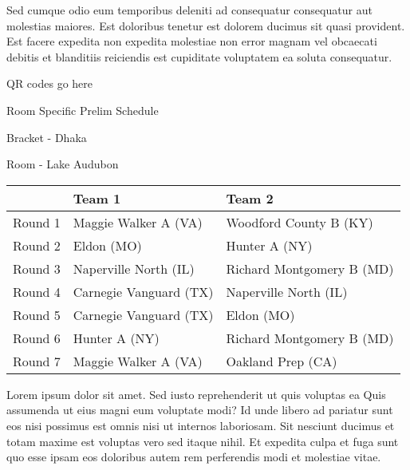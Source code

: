 \documentclass{article}%
\begin{document}
\newline%
Sed cumque odio eum temporibus deleniti ad consequatur consequatur aut molestias maiores. Est doloribus tenetur est dolorem ducimus sit quasi provident. Est facere expedita non expedita molestiae non error magnam vel obcaecati debitis et blanditiis reiciendis est cupiditate voluptatem ea soluta consequatur.%
\vspace*{140pt}%
\begin{center}%
\begin{Huge}%
QR codes go here%
\end{Huge}%
\end{center}%
\newpage%
\begin{center}%
\begin{Huge}%
Room Specific Prelim Schedule%
\end{Huge}%
\vspace*{8pt}%
\linebreak%
\begin{Large}%
Bracket {-} Dhaka%
\end{Large}%
\vspace*{8pt}%
\linebreak%
\vspace*{8pt}%
\begin{Large}%
Room {-} Lake Audubon%
\end{Large}%
\end{center}%
%
\begin{tabularx}{\textwidth}{|c|Y|Y|}%
\hline%
&Team 1&Team 2\\%
\hline%
Round 1&Maggie Walker A (VA)&Woodford County B (KY)\\%
Round 2&Eldon (MO)&Hunter A (NY)\\%
Round 3&Naperville North (IL)&Richard Montgomery B (MD)\\%
Round 4&Carnegie Vanguard (TX)&Naperville North (IL)\\%
Round 5&Carnegie Vanguard (TX)&Eldon (MO)\\%
Round 6&Hunter A (NY)&Richard Montgomery B (MD)\\%
Round 7&Maggie Walker A (VA)&Oakland Prep (CA)\\%
\hline%
\end{tabularx}%
\vspace*{8pt}%
\newline%
Lorem ipsum dolor sit amet. Sed iusto reprehenderit ut quis voluptas ea Quis assumenda ut eius magni eum voluptate modi? Id unde libero ad pariatur sunt eos nisi possimus est omnis nisi ut internos laboriosam. Sit nesciunt ducimus et totam maxime est voluptas vero sed itaque nihil. Et expedita culpa et fuga sunt quo esse ipsam eos doloribus autem rem perferendis modi et molestiae vitae.\newline%
\end{document}

